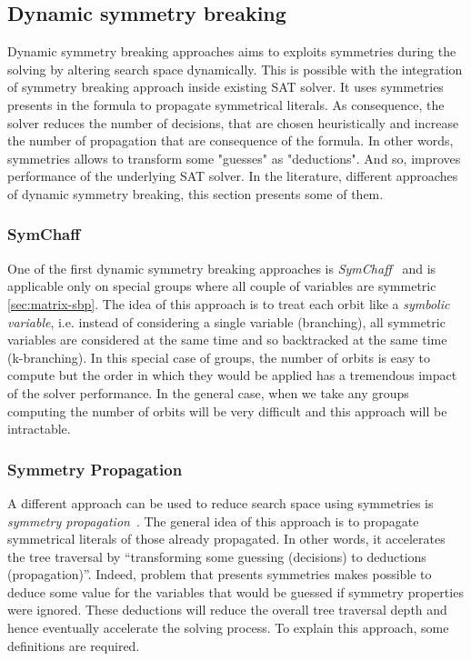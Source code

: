 % 


\subsection{Dynamic symmetry breaking}


Dynamic symmetry breaking approaches aims to exploits symmetries during the solving by altering search space dynamically.
This is possible with the integration of symmetry breaking approach inside existing SAT solver. It uses symmetries presents 
in the formula to propagate symmetrical literals.
As consequence, the solver reduces the number of decisions, that are chosen heuristically and increase the number of propagation
that are consequence of the formula. In other words, symmetries allows to transform some "guesses" as "deductions".
And so, improves performance of the underlying SAT solver.
In the literature, different approaches of dynamic symmetry breaking, this section presents some of them.


\subsubsection{SymChaff}
One of the first dynamic symmetry breaking approaches is \emph{SymChaff}~\cite{sabharwal2005symchaff}
and is applicable only on special groups where all couple of variables are symmetric \cref{sec:matrix-sbp}.
The idea of this approach is to treat each orbit like a \emph{symbolic variable}, i.e. instead of considering a single
variable (branching), all symmetric variables are considered at the same time and so backtracked at the same time 
(k-branching).
In this special case of groups, the number of orbits is easy to compute but the order in which they would be
applied has a tremendous impact of the solver performance.
In the general case, when we take any groups computing the number of orbits will be very difficult and this approach
will be intractable.

\subsubsection{Symmetry Propagation}
A different approach can be used to reduce search space using symmetries is \emph{symmetry propagation}~\cite{Devriendt12}.
The general idea of this approach is to propagate symmetrical literals of those already propagated.
In other words, it accelerates the tree traversal by ``transforming some guessing (decisions) to deductions (propagation)''.
Indeed, problem that presents symmetries makes possible to deduce some value 
for the variables that would be guessed if symmetry properties were ignored.
These deductions will reduce the overall tree traversal depth and hence eventually accelerate the solving process.
To explain this approach, some definitions are required.

